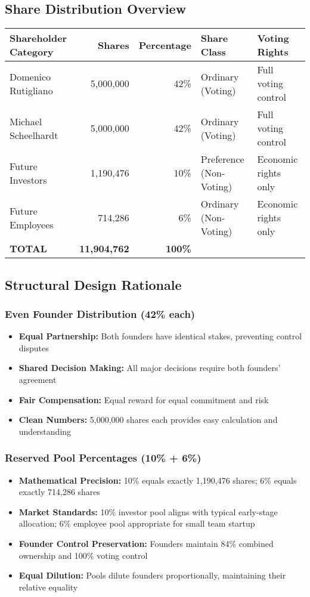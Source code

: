 \subsection*{Share Distribution Overview}

\begin{tabularx}{\textwidth}{@{} l r r l l @{}}
\textbf{Shareholder Category} & \textbf{Shares} & \textbf{Percentage} & \textbf{Share Class} & \textbf{Voting Rights} \\
\hline
Domenico Rutigliano & 5,000,000 & 42\% & Ordinary (Voting) & Full voting control \\
Michael Scheelhardt & 5,000,000 & 42\% & Ordinary (Voting) & Full voting control \\
Future Investors & 1,190,476 & 10\% & Preference (Non-Voting) & Economic rights only \\
Future Employees & 714,286 & 6\% & Ordinary (Non-Voting) & Economic rights only \\
\hline
\textbf{TOTAL} & \textbf{11,904,762} & \textbf{100\%} & & \\
\end{tabularx}

\subsection*{Structural Design Rationale}

\subsubsection*{Even Founder Distribution (42\% each)}
\begin{itemize}
    \item \textbf{Equal Partnership:} Both founders have identical stakes, preventing control disputes
    \item \textbf{Shared Decision Making:} All major decisions require both founders' agreement
    \item \textbf{Fair Compensation:} Equal reward for equal commitment and risk
    \item \textbf{Clean Numbers:} 5,000,000 shares each provides easy calculation and understanding
\end{itemize}

\subsubsection*{Reserved Pool Percentages (10\% + 6\%)}
\begin{itemize}
    \item \textbf{Mathematical Precision:} 10\% equals exactly 1,190,476 shares; 6\% equals exactly 714,286 shares
    \item \textbf{Market Standards:} 10\% investor pool aligns with typical early-stage allocation; 6\% employee pool appropriate for small team startup
    \item \textbf{Founder Control Preservation:} Founders maintain 84\% combined ownership and 100\% voting control
    \item \textbf{Equal Dilution:} Pools dilute founders proportionally, maintaining their relative equality
\end{itemize}

